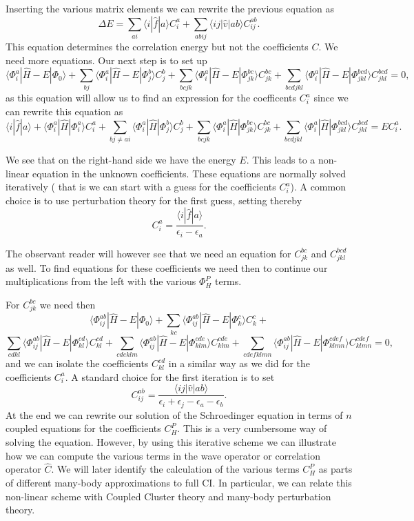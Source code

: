 Inserting the various matrix elements we can rewrite the previous equation as
\[
\Delta E=\sum_{ai}\langle i| \hat{f}|a \rangle C_{i}^{a}+
\sum_{abij}\langle ij | \hat{v}| ab \rangle C_{ij}^{ab}.
\]
This equation determines the correlation energy but not the coefficients $C$. 
We need more equations. Our next step is to set up
\[
\langle \Phi_i^a | \hat{H} -E| \Phi_0\rangle + \sum_{bj}\langle \Phi_i^a | \hat{H} -E|\Phi_{j}^{b} \rangle C_{j}^{b}+
\sum_{bcjk}\langle \Phi_i^a | \hat{H} -E|\Phi_{jk}^{bc} \rangle C_{jk}^{bc}+
\sum_{bcdjkl}\langle \Phi_i^a | \hat{H} -E|\Phi_{jkl}^{bcd} \rangle C_{jkl}^{bcd}=0,
\]
as this equation will allow us to find an expression for the coefficents $C_i^a$ since we can rewrite this equation as 
\[
\langle i | \hat{f}| a\rangle +\langle \Phi_i^a | \hat{H}|\Phi_{i}^{a} \rangle C_{i}^{a}+ \sum_{bj\ne ai}\langle \Phi_i^a | \hat{H}|\Phi_{j}^{b} \rangle C_{j}^{b}+
\sum_{bcjk}\langle \Phi_i^a | \hat{H}|\Phi_{jk}^{bc} \rangle C_{jk}^{bc}+
\sum_{bcdjkl}\langle \Phi_i^a | \hat{H}|\Phi_{jkl}^{bcd} \rangle C_{jkl}^{bcd}=EC_i^a.
\]

We see that on the right-hand side we have the energy $E$. This leads to a non-linear equation in the unknown coefficients. 
These equations are normally solved iteratively ( that is we can start with a guess for the coefficients $C_i^a$). A common choice is to use perturbation theory for the first guess, setting thereby
\[
 C_{i}^{a}=\frac{\langle i | \hat{f}| a\rangle}{\epsilon_i-\epsilon_a}.
\]

The observant reader will however see that we need an equation for $C_{jk}^{bc}$ and $C_{jkl}^{bcd}$ as well.
To find equations for these coefficients we need then to continue our multiplications from the left with the various
$\Phi_{H}^P$ terms. 


For $C_{jk}^{bc}$ we need then
\[
\langle \Phi_{ij}^{ab} | \hat{H} -E| \Phi_0\rangle + \sum_{kc}\langle \Phi_{ij}^{ab} | \hat{H} -E|\Phi_{k}^{c} \rangle C_{k}^{c}+
\]
\[
\sum_{cdkl}\langle \Phi_{ij}^{ab} | \hat{H} -E|\Phi_{kl}^{cd} \rangle C_{kl}^{cd}+\sum_{cdeklm}\langle \Phi_{ij}^{ab} | \hat{H} -E|\Phi_{klm}^{cde} \rangle C_{klm}^{cde}+\sum_{cdefklmn}\langle \Phi_{ij}^{ab} | \hat{H} -E|\Phi_{klmn}^{cdef} \rangle C_{klmn}^{cdef}=0,
\]
and we can isolate the coefficients $C_{kl}^{cd}$ in a similar way as we did for the coefficients $C_{i}^{a}$. 
A standard choice for the first iteration is to set 
\[
C_{ij}^{ab} =\frac{\langle ij \vert \hat{v} \vert ab \rangle}{\epsilon_i+\epsilon_j-\epsilon_a-\epsilon_b}.
\]
At the end we can rewrite our solution of the Schroedinger equation in terms of $n$ coupled equations for the coefficients $C_H^P$.
This is a very cumbersome way of solving the equation. However, by using this iterative scheme we can illustrate how we can compute the
various terms in the wave operator or correlation operator $\hat{C}$. We will later identify the calculation of the various terms $C_H^P$
as parts of different many-body approximations to full CI. In particular, we can  relate this non-linear scheme with Coupled Cluster theory and
many-body perturbation theory.


